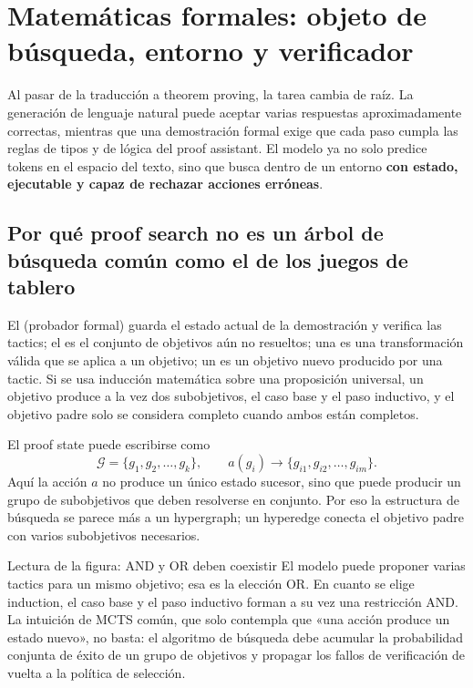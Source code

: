 \section{Matemáticas formales: objeto de búsqueda, entorno y verificador}

Al pasar de la traducción a theorem proving, la tarea cambia de raíz. La generación de lenguaje natural puede aceptar varias respuestas aproximadamente correctas, mientras que una demostración formal exige que cada paso cumpla las reglas de tipos y de lógica del proof assistant. El modelo ya no solo predice tokens en el espacio del texto, sino que busca dentro de un entorno \textbf{con estado, ejecutable y capaz de rechazar acciones erróneas}.

\subsection{Por qué proof search no es un árbol de búsqueda común como el de los juegos de tablero}

El  (probador formal) guarda el estado actual de la demostración y verifica las tactics; el  es el conjunto de objetivos aún no resueltos; una  es una transformación válida que se aplica a un objetivo; un  es un objetivo nuevo producido por una tactic. Si se usa inducción matemática sobre una proposición universal, un objetivo produce a la vez dos subobjetivos, el caso base y el paso inductivo, y el objetivo padre solo se considera completo cuando ambos están completos.

El proof state puede escribirse como
\[
\mathcal{G}=\{g_1,g_2,\ldots,g_k\},
\qquad
a(g_i)\rightarrow\{g_{i1},g_{i2},\ldots,g_{im}\}.
\]
Aquí la acción $a$ no produce un único estado sucesor, sino que puede producir un grupo de subobjetivos que deben resolverse en conjunto. Por eso la estructura de búsqueda se parece más a un hypergraph; un hyperedge conecta el objetivo padre con varios subobjetivos necesarios.


\begin{knowledgebox}{Lectura de la figura: AND y OR deben coexistir}
El modelo puede proponer varias tactics para un mismo objetivo; esa es la elección OR. En cuanto se elige induction, el caso base y el paso inductivo forman a su vez una restricción AND. La intuición de MCTS común, que solo contempla que «una acción produce un estado nuevo», no basta: el algoritmo de búsqueda debe acumular la probabilidad conjunta de éxito de un grupo de objetivos y propagar los fallos de verificación de vuelta a la política de selección.
\end{knowledgebox}

